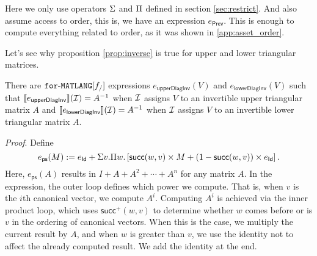 \newtheorem*{INVERSE}{Proposition~\ref{prop:inverse}}

Here we only use operators $\Sigma$ and $\Pi$ defined in section \ref{sec:restrict}. 
And also assume access to order, this is, we have an expression $e_{\mathsf{Prev}}$. This is enough to 
compute everything related to order, as it was shown in \ref{app:asset_order}.

Let's see why proposition \ref{prop:inverse} is true for upper and lower triangular matrices.
\begin{lemma}\label{prop:upperlowerinverse}
There are $\texttt{for}\text{-}\texttt{MATLANG}[f_/]$ expressions $e_{\mathsf{upperDiagInv}}(V)$ and $e_{\mathsf{lowerDiagInv}}(V)$
such that $\llbracket e_{\mathsf{upperDiagInv}} \rrbracket(\mathcal{I})=A^{-1}$ when $\mathcal{I}$ assigns $V$
to an invertible upper triangular matrix $A$ and $\llbracket e_{\mathsf{lowerDiagInv}} \rrbracket(\mathcal{I})=A^{-1}$ when $\mathcal{I}$ assigns $V$
to an invertible lower triangular matrix $A$.
\end{lemma}

\textit{Proof}. Define
$$
e_{\mathsf{ps}}(M):= e_{\mathsf{Id}} + \Sigma v.\Pi w. \left[ \mathsf{succ}(w,v)\times M + (1 - \mathsf{succ}(w,v))\times e_{\mathsf{Id}} \right].
$$
Here, $e_{\mathsf{ps}}(A)$ results in $I+A+A^2+\cdots + A^n$ for any matrix $A$. In the expression, the outer loop defines which power we compute. 
That is, when $v$ is the $i$th canonical vector, we compute $A^i$.
Computing $A^i$ is achieved via the inner product loop, which uses $\mathsf{succ}^+(w,v)$ to 
determine whether $w$ comes before or is $v$ in the ordering of canonical vectors.
When this is the case, we multiply the current result by $A$, and when $w$ is greater 
than $v$, we use the identity not to affect the already computed result. We add the identity at the end.

